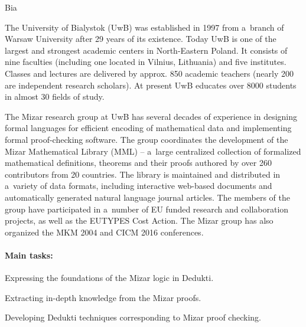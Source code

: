 \begin{sitedescription}{Bia}



The University of Bialystok (UwB) was established in 1997 from a~branch of Warsaw University after 29 years of its existence.
Today UwB is one of the largest and strongest academic centers in North-Eastern Poland.
It consists of nine faculties (including one located in Vilnius, Lithuania) and five institutes.
Classes and lectures are delivered by approx. 850 academic teachers (nearly 200 are independent research scholars).
At present UwB educates over 8000 students in almost 30 fields of study.

The Mizar research group at UwB has several decades of experience in designing formal languages 
for efficient encoding of mathematical data and implementing formal proof-checking software.
The group coordinates the development of the Mizar Mathematical Library (MML) -- 
a~large centralized collection of formalized mathematical definitions, theorems and their proofs 
authored by over 260 contributors from 20 countries.
The library is maintained and distributed in a~variety of data formats, 
including interactive web-based documents and automatically generated natural language journal articles. 
The members of the group have participated in a~number of EU funded research
and collaboration projects,
as well as the EUTYPES Cost Action.
The Mizar group has also organized the MKM 2004 and CICM 2016 conferences.

\paragraph*{Main tasks:}

\begin{compactitem}
\item Expressing the foundations of the Mizar logic in Dedukti.  
\item Extracting in-depth knowledge from the Mizar proofs.  
\item Developing Dedukti techniques corresponding to Mizar proof checking.  
\end{compactitem}


\end{sitedescription}
